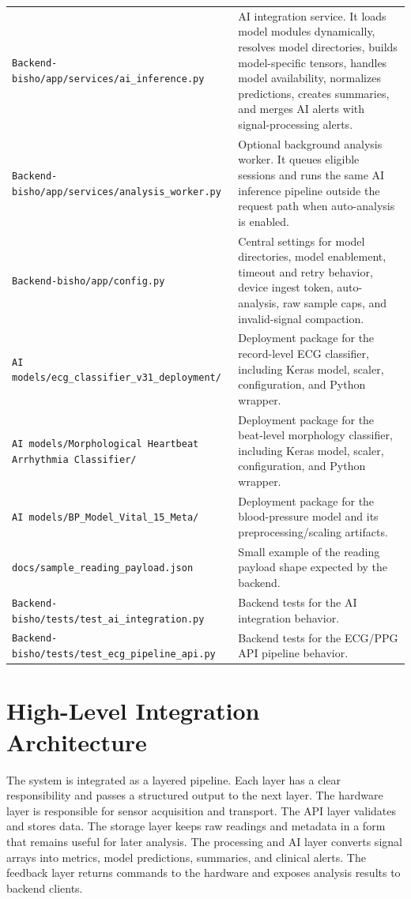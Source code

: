 \begin{longtable}{p{}p{}}
\texttt{Backend-bisho/app/services/ai\_inference.py} & AI integration service. It loads model modules dynamically, resolves model directories, builds model-specific tensors, handles model availability, normalizes predictions, creates summaries, and merges AI alerts with signal-processing alerts.\\
\texttt{Backend-bisho/app/services/analysis\_worker.py} & Optional background analysis worker. It queues eligible sessions and runs the same AI inference pipeline outside the request path when auto-analysis is enabled.\\
\texttt{Backend-bisho/app/config.py} & Central settings for model directories, model enablement, timeout and retry behavior, device ingest token, auto-analysis, raw sample caps, and invalid-signal compaction.\\
\texttt{AI models/ecg\_classifier\_v31\_deployment/} & Deployment package for the record-level ECG classifier, including Keras model, scaler, configuration, and Python wrapper.\\
\texttt{AI models/Morphological Heartbeat Arrhythmia Classifier/} & Deployment package for the beat-level morphology classifier, including Keras model, scaler, configuration, and Python wrapper.\\
\texttt{AI models/BP\_Model\_Vital\_15\_Meta/} & Deployment package for the blood-pressure model and its preprocessing/scaling artifacts.\\
\texttt{docs/sample\_reading\_payload.json} & Small example of the reading payload shape expected by the backend.\\
\texttt{Backend-bisho/tests/test\_ai\_integration.py} & Backend tests for the AI integration behavior.\\
\texttt{Backend-bisho/tests/test\_ecg\_pipeline\_api.py} & Backend tests for the ECG/PPG API pipeline behavior.\\
\bottomrule
\end{longtable}

\section{High-Level Integration Architecture}

The system is integrated as a layered pipeline. Each layer has a clear responsibility and passes a structured output to the next layer. The hardware layer is responsible for sensor acquisition and transport. The API layer validates and stores data. The storage layer keeps raw readings and metadata in a form that remains useful for later analysis. The processing and AI layer converts signal arrays into metrics, model predictions, summaries, and clinical alerts. The feedback layer returns commands to the hardware and exposes analysis results to backend clients.


